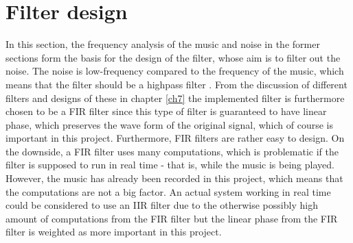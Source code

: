 \section{Filter design}
In this section, the frequency analysis of the music and noise in the former sections form the basis for the design of the filter, whose aim is to filter out the noise. The noise is low-frequency compared to the frequency of the music, which means that the filter should be a highpass filter . From the discussion of different filters and designs of these in chapter \ref{ch7} the implemented filter is furthermore chosen to be a FIR filter since this type of filter is guaranteed to have linear phase, which preserves the wave form of the original signal, which of course is important in this project. Furthermore, FIR filters are rather easy to design. On the downside, a FIR filter uses many computations, which is problematic if the filter is supposed to run in real time - that is, while the music is being played. However, the music has already been recorded in this project, which means that the computations are not a big factor. An actual system working in real time could be considered to use an IIR filter due to the otherwise possibly high amount of computations from the FIR filter but the linear phase from the FIR filter is weighted as more important in this project.